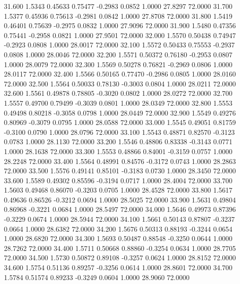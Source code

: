   31.600   1.5343   0.45633   0.75477  -0.2983   0.0852   1.0000  27.8297  72.0000
  31.700   1.5377   0.45936   0.75613  -0.2981   0.0842   1.0000  27.8708  72.0000
  31.800   1.5419   0.46401   0.75639  -0.2975   0.0832   1.0000  27.9096  72.0000
  31.900   1.5480   0.47356   0.75441  -0.2958   0.0821   1.0000  27.9501  72.0000
  32.000   1.5570   0.50438   0.74947  -0.2923   0.0808   1.0000  28.0017  72.0000
  32.100   1.5572   0.50433   0.75553  -0.2937   0.0808   1.0000  28.0046  72.0000
  32.200   1.5571   0.50372   0.76180  -0.2953   0.0807   1.0000  28.0079  72.0000
  32.300   1.5569   0.50278   0.76821  -0.2969   0.0806   1.0000  28.0117  72.0000
  32.400   1.5566   0.50165   0.77470  -0.2986   0.0805   1.0000  28.0160  72.0000
  32.500   1.5564   0.50033   0.78130  -0.3003   0.0804   1.0000  28.0211  72.0000
  32.600   1.5561   0.49878   0.78805  -0.3020   0.0802   1.0000  28.0272  72.0000
  32.700   1.5557   0.49700   0.79499  -0.3039   0.0801   1.0000  28.0349  72.0000
  32.800   1.5553   0.49498   0.80218  -0.3058   0.0798   1.0000  28.0449  72.0000
  32.900   1.5549   0.49276   0.80969  -0.3079   0.0795   1.0000  28.0588  72.0000
  33.000   1.5545   0.49051   0.81759  -0.3100   0.0790   1.0000  28.0796  72.0000
  33.100   1.5543   0.48871   0.82570  -0.3123   0.0783   1.0000  28.1130  72.0000
  33.200   1.5546   0.48806   0.83338  -0.3143   0.0771   1.0000  28.1638  72.0000
  33.300   1.5553   0.48866   0.84001  -0.3159   0.0757   1.0000  28.2248  72.0000
  33.400   1.5564   0.48991   0.84576  -0.3172   0.0743   1.0000  28.2863  72.0000
  33.500   1.5576   0.49141   0.85101  -0.3183   0.0730   1.0000  28.3450  72.0000
  33.600   1.5589   0.49302   0.85596  -0.3194   0.0717   1.0000  28.4004  72.0000
  33.700   1.5603   0.49468   0.86070  -0.3203   0.0705   1.0000  28.4528  72.0000
  33.800   1.5617   0.49636   0.86526  -0.3212   0.0694   1.0000  28.5025  72.0000
  33.900   1.5631   0.49804   0.86968  -0.3221   0.0684   1.0000  28.5497  72.0000
  34.000   1.5646   0.49973   0.87396  -0.3229   0.0674   1.0000  28.5944  72.0000
  34.100   1.5661   0.50143   0.87807  -0.3237   0.0664   1.0000  28.6382  72.0000
  34.200   1.5676   0.50313   0.88193  -0.3244   0.0654   1.0000  28.6820  72.0000
  34.300   1.5693   0.50487   0.88548  -0.3250   0.0644   1.0000  28.7262  72.0000
  34.400   1.5711   0.50668   0.88860  -0.3254   0.0634   1.0000  28.7705  72.0000
  34.500   1.5730   0.50872   0.89108  -0.3257   0.0624   1.0000  28.8152  72.0000
  34.600   1.5754   0.51136   0.89257  -0.3256   0.0614   1.0000  28.8601  72.0000
  34.700   1.5784   0.51574   0.89233  -0.3249   0.0604   1.0000  28.9060  72.0000
